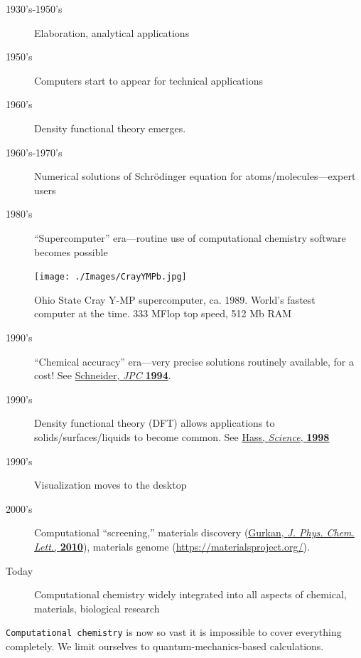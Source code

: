 \documentclass[11pt]{article}
\begin{document}
\begin{description}
\item[{1930's-1950's}] Elaboration, analytical applications

\item[{1950's}] Computers start to appear for technical applications

\item[{1960's}] Density functional theory emerges.

\item[{1960's-1970's}] Numerical solutions of Schr\"{o}dinger equation for atoms/molecules---expert users

\item[{1980's}] ``Supercomputer'' era---routine use of computational chemistry software becomes possible
\end{description}
\begin{figure}[htbp]
\centering
\texttt{[image: ./Images/CrayYMPb.jpg]}
\caption{Ohio State Cray Y-MP supercomputer, ca. 1989.  World's fastest computer at the time.  333 MFlop top speed, 512 Mb RAM}
\end{figure}

\begin{description}
\item[{1990's}] ``Chemical accuracy'' era---very precise solutions routinely available, for a cost!  See \href{./Resources/1994\_WFS\_JPC.pdf}{Schneider, \emph{JPC} \textbf{1994}}.

\item[{1990's}] Density functional theory (DFT) allows applications to solids/surfaces/liquids to become common. See \href{./Resources/1998\_Hass\_Science.pdf}{Hass, \emph{Science}, \textbf{1998}}

\item[{1990's}] Visualization moves to the desktop

\item[{2000's}] Computational ``screening,'' materials discovery (\href{http://www.crc.nd.edu/\~wschnei1/courses/CBE\_547/Resources/2010\_Gurkan\_JPCL.pdf}{Gurkan, \emph{J. Phys. Chem. Lett.}, \textbf{2010}}), materials genome (\url{https://materialsproject.org/}).

\item[{Today}] Computational chemistry widely integrated into all aspects of chemical, materials, biological research
\end{description}

\texttt{Computational chemistry} is now so vast it is impossible to cover everything completely.  We limit ourselves to quantum-mechanics-based calculations.
\end{document}
